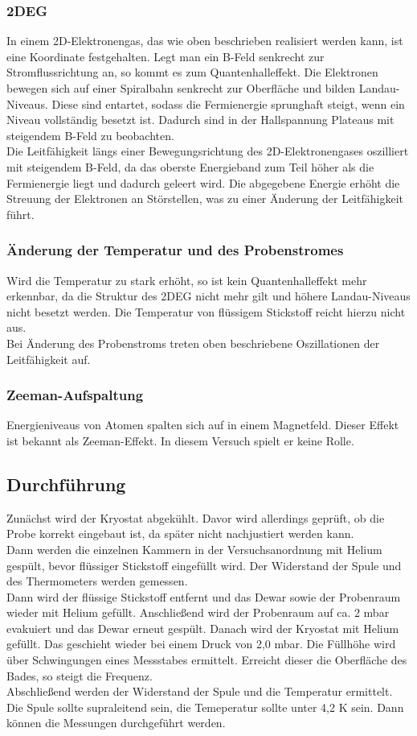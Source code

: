 \subsubsection{2DEG}
In einem 2D-Elektronengas, das wie oben beschrieben realisiert werden kann, ist eine Koordinate festgehalten. Legt man ein B-Feld senkrecht zur Stromflussrichtung an, so kommt es zum Quantenhalleffekt. Die Elektronen bewegen sich auf einer Spiralbahn senkrecht zur Oberfläche und bilden Landau-Niveaus. Diese sind entartet, sodass die Fermienergie sprunghaft steigt, wenn ein Niveau vollständig besetzt ist. Dadurch sind in der Hallspannung Plateaus mit steigendem B-Feld zu beobachten. \\
Die Leitfähigkeit längs einer Bewegungsrichtung des 2D-Elektronengases oszilliert mit steigendem B-Feld, da das oberste Energieband zum Teil höher als die Fermienergie liegt und dadurch geleert wird. Die abgegebene Energie erhöht die Streuung der Elektronen an Störstellen, was zu einer Änderung der Leitfähigkeit führt.
\subsubsection{Änderung der Temperatur und des Probenstromes}
Wird die Temperatur zu stark erhöht, so ist kein Quantenhalleffekt mehr erkennbar, da die Struktur des 2DEG nicht mehr gilt und höhere Landau-Niveaus nicht besetzt werden. Die Temperatur von flüssigem Stickstoff reicht hierzu nicht aus.\\
Bei Änderung des Probenstroms treten oben beschriebene Oszillationen der Leitfähigkeit auf.
\subsubsection{Zeeman-Aufspaltung}
Energieniveaus von Atomen spalten sich auf in einem Magnetfeld. Dieser Effekt ist bekannt als Zeeman-Effekt. In diesem Versuch spielt er keine Rolle. 
\subsection{Durchführung}
Zunächst wird der Kryostat abgekühlt. Davor wird allerdings geprüft, ob die Probe korrekt eingebaut ist, da später nicht nachjustiert werden kann. \\
Dann werden die einzelnen Kammern in der Versuchsanordnung mit Helium gespült, bevor flüssiger Stickstoff eingefüllt wird. Der Widerstand der Spule und des Thermometers werden gemessen. \\
Dann wird der flüssige Stickstoff entfernt und das Dewar sowie der Probenraum wieder mit Helium gefüllt. Anschließend wird der Probenraum auf ca. 2 mbar evakuiert und das Dewar erneut gespült. Danach wird der Kryostat mit Helium gefüllt. Das geschieht wieder bei einem Druck von 2,0 mbar. Die Füllhöhe wird über Schwingungen eines Messstabes ermittelt. Erreicht dieser die Oberfläche des Bades, so steigt die Frequenz. \\
Abschließend werden der Widerstand der Spule und die Temperatur ermittelt. Die Spule sollte supraleitend sein, die Temeperatur sollte unter 4,2 K sein. Dann können die Messungen durchgeführt werden.
